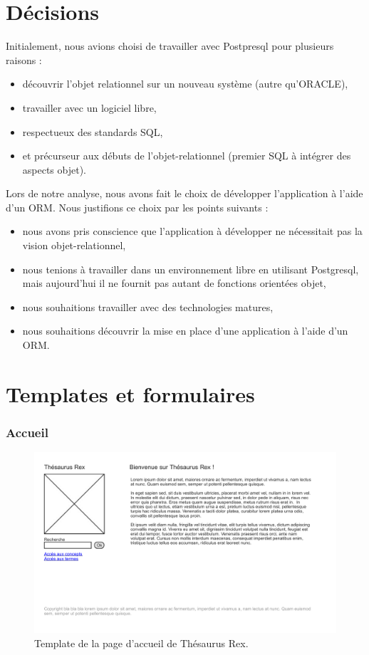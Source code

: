 \section{Décisions}

Initialement, nous avions choisi de travailler avec Postpresql pour plusieurs raisons :
\begin{itemize}
\item découvrir l'objet relationnel sur un nouveau système (autre qu'ORACLE),
\item travailler avec un logiciel libre,
\item respectueux des standards SQL,
\item et précurseur aux débuts de l'objet-relationnel (premier SQL à intégrer des aspects objet).
\end{itemize}

Lors de notre analyse, nous avons fait le choix de développer l'application à l'aide d'un ORM. Nous justifions ce choix par les points suivants :
\begin{itemize}
\item nous avons pris conscience que l'application à développer ne nécessitait pas la vision objet-relationnel,
\item nous tenions à travailler dans un environnement libre en utilisant Postgresql, mais aujourd'hui il ne fournit pas autant de fonctions orientées objet,
\item nous souhaitions travailler avec des technologies matures,
\item nous souhaitions découvrir la mise en place d'une application à l'aide d'un ORM.
\end{itemize}
	
	
\section{Templates et formulaires}

\subsubsection{Accueil}
\begin{figure}[H]
\begin{center}
\includegraphics[width=\textwidth]{files/template_accueil}
\end{center}
\caption{Template de la page d'accueil de Thésaurus Rex.}
\end{figure}

